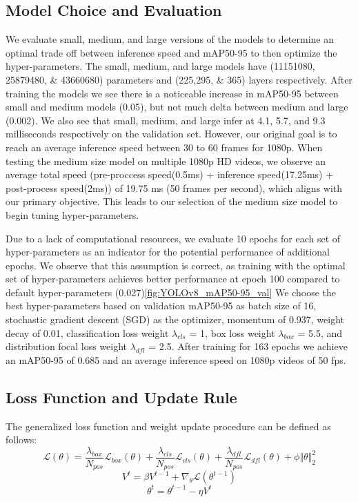 \documentclass[10pt,twocolumn,letterpaper]{article}
\begin{document}
\subsection{Model Choice and Evaluation}

We evaluate small, medium, and large versions of the models to determine an optimal trade off between inference speed and mAP50-95 to then optimize the hyper-parameters. The small, medium, and large models have (11151080, 25879480, \& 43660680) parameters and (225,295, \& 365) layers respectively. After training the models we see there is a noticeable increase in mAP50-95 between small and medium models (0.05), but not much delta between medium and large (0.002). We also see that small, medium, and large infer at 4.1, 5.7, and 9.3 milliseconds respectively on the validation set. However, our original goal is to reach an average inference speed between 30 to 60 frames for 1080p. When testing the medium size model on multiple 1080p HD videos, we observe an average total speed (pre-proccess speed(0.5ms) + inference speed(17.25ms) + post-process speed(2ms)) of 19.75 ms (50 frames per second), which aligns with our primary objective. This leads to our selection of the medium size model to begin tuning hyper-parameters.

Due to a lack of computational resources, we evaluate 10 epochs for each set of hyper-parameters as an indicator for the potential performance of additional epochs. We observe that this assumption is correct, as training with the optimal set of hyper-parameters achieves better performance at epoch 100 compared to default hyper-parameters (0.027)\ref{fig:YOLOv8_mAP50-95_val} We choose the best hyper-parameters based on validation mAP50-95 as batch size of 16, stochastic gradient descent (SGD) as the optimizer, momentum of 0.937, weight decay of 0.01, classification loss weight $\lambda_{cls}$ = 1, box loss weight $\lambda_{box}$ = 5.5, and distribution focal loss weight $\lambda_{dfl}$ = 2.5. After training for 163 epochs we achieve an mAP50-95 of 0.685 and an average inference speed on 1080p videos of 50 fps.

\subsection{Loss Function and Update Rule}
The generalized loss function and weight update procedure can be defined as follows: 
\begin{equation}\label{Generalized Loss}
\mathcal{L}(\theta) = \dfrac{\lambda_{box}}{N_{pos}}\mathcal{L}_{box}(\theta) + \dfrac{\lambda_{cls}}{N_{pos}}\mathcal{L}_{cls}(\theta) + \dfrac{\lambda_{dfl}}{N_{pos}}\mathcal{L}_{dfl}(\theta) + \phi\Vert \theta \Vert_2^2
\end{equation}    
\begin{equation}\label{Velocity}
V^t = \beta V^{t-1} + \nabla_{\theta}\mathcal{L}(\theta^{t-1})
\end{equation}    
\begin{equation}\label{Weight Update}
\theta^{t} = \theta^{t-1} - \eta V^{t}
\end{equation}
\end{document}
